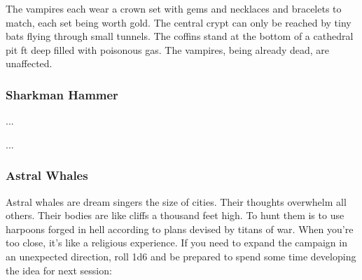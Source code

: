 \documentclass[11pt]{bxart}
\begin{document}
The vampires each wear a crown set with gems and necklaces and
bracelets to match, each set being worth \unit[10,000]{gold}. The
central crypt can only be reached by tiny bats flying through small
tunnels. The coffins stand at the bottom of a cathedral pit
\unit[100]{ft} deep filled with poisonous gas. The vampires, being
already dead, are unaffected.

\subsubsection{Sharkman Hammer}

...

\newpage

...

\newpage

\subsubsection{Astral Whales}

Astral whales are dream singers the size of cities. Their thoughts
overwhelm all others. Their bodies are like cliffs a thousand feet
high. To hunt them is to use harpoons forged in hell according to
plans devised by titans of war. When you're too close, it's like a
religious experience. If you need to expand the campaign in an
unexpected direction, roll 1d6 and be prepared to spend some time
developing the idea for next session:
\end{document}
